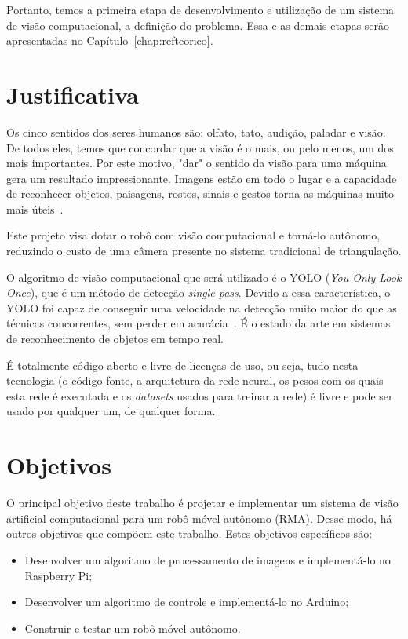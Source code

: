Portanto, temos a primeira etapa de desenvolvimento e utilização de um sistema de visão computacional, a definição do problema. Essa e as demais etapas serão apresentadas no Capítulo~\ref{chap:refteorico}.

\section{Justificativa}
\label{sec:justi}

Os cinco sentidos dos seres humanos são: olfato, tato, audição, paladar e visão. De todos eles, temos que concordar que a visão é o mais, ou pelo menos, um dos mais importantes. Por este motivo, "dar" o sentido da visão para uma máquina gera um resultado impressionante. Imagens estão em todo o lugar e a capacidade de reconhecer objetos, paisagens, rostos, sinais e gestos torna as máquinas muito mais úteis~\cite{antonello2014introduccao}.

Este projeto visa dotar o robô com visão computacional e torná-lo autônomo, reduzindo o custo de uma câmera presente no sistema tradicional de triangulação.

O algoritmo de visão computacional que será utilizado é o YOLO (\textit{You Only Look Once}), que é um método de detecção \textit{single pass}. Devido a essa característica, o YOLO foi capaz de conseguir uma velocidade na detecção muito maior do que as técnicas concorrentes, sem perder em acurácia~\cite{alvesGabriel2020}. É o estado da arte em sistemas de reconhecimento de objetos em tempo real.

É totalmente código aberto e livre de licenças de uso, ou seja, tudo nesta tecnologia (o código-fonte, a arquitetura da rede neural, os pesos com os quais esta rede é executada e os \textit{datasets} usados para treinar a rede) é livre e pode ser usado por qualquer um, de qualquer forma.



\section{Objetivos}
\label{sec:objt}

O principal objetivo deste trabalho é projetar e implementar um sistema de visão artificial computacional para um robô móvel autônomo (RMA). Desse modo, há outros objetivos que compõem este trabalho. Estes objetivos específicos são:

\begin{itemize}
    \item Desenvolver um algoritmo de processamento de imagens e implementá-lo no Raspberry Pi;
    \item Desenvolver um algoritmo de controle e implementá-lo no Arduino;
    \item Construir e testar um robô móvel autônomo.
\end{itemize}







